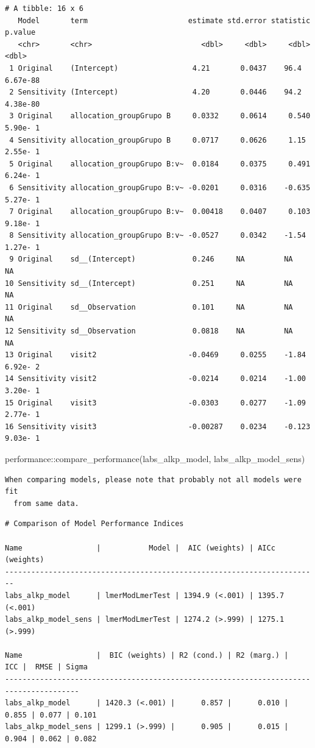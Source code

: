 \documentclass[
  letterpaper,
  DIV=11,
  numbers=noendperiod]{scrartcl}
\newenvironment{Shaded}{\begin{snugshade}}{\end{snugshade}}
\newcommand{\FunctionTok}[1]{\textcolor[rgb]{0.28,0.35,0.67}{#1}}
\newcommand{\NormalTok}[1]{\textcolor[rgb]{0.00,0.23,0.31}{#1}}
\newcommand{\SpecialCharTok}[1]{\textcolor[rgb]{0.37,0.37,0.37}{#1}}
\begin{document}
\begin{verbatim}
# A tibble: 16 x 6
   Model       term                       estimate std.error statistic   p.value
   <chr>       <chr>                         <dbl>     <dbl>     <dbl>     <dbl>
 1 Original    (Intercept)                 4.21       0.0437    96.4    6.67e-88
 2 Sensitivity (Intercept)                 4.20       0.0446    94.2    4.38e-80
 3 Original    allocation_groupGrupo B     0.0332     0.0614     0.540  5.90e- 1
 4 Sensitivity allocation_groupGrupo B     0.0717     0.0626     1.15   2.55e- 1
 5 Original    allocation_groupGrupo B:v~  0.0184     0.0375     0.491  6.24e- 1
 6 Sensitivity allocation_groupGrupo B:v~ -0.0201     0.0316    -0.635  5.27e- 1
 7 Original    allocation_groupGrupo B:v~  0.00418    0.0407     0.103  9.18e- 1
 8 Sensitivity allocation_groupGrupo B:v~ -0.0527     0.0342    -1.54   1.27e- 1
 9 Original    sd__(Intercept)             0.246     NA         NA     NA       
10 Sensitivity sd__(Intercept)             0.251     NA         NA     NA       
11 Original    sd__Observation             0.101     NA         NA     NA       
12 Sensitivity sd__Observation             0.0818    NA         NA     NA       
13 Original    visit2                     -0.0469     0.0255    -1.84   6.92e- 2
14 Sensitivity visit2                     -0.0214     0.0214    -1.00   3.20e- 1
15 Original    visit3                     -0.0303     0.0277    -1.09   2.77e- 1
16 Sensitivity visit3                     -0.00287    0.0234    -0.123  9.03e- 1
\end{verbatim}

\begin{Shaded}
\begin{Highlighting}[]
\NormalTok{performance}\SpecialCharTok{::}\FunctionTok{compare\_performance}\NormalTok{(labs\_alkp\_model, labs\_alkp\_model\_sens)}
\end{Highlighting}
\end{Shaded}

\begin{verbatim}
When comparing models, please note that probably not all models were fit
  from same data.
\end{verbatim}

\begin{verbatim}
# Comparison of Model Performance Indices

Name                 |           Model |  AIC (weights) | AICc (weights)
------------------------------------------------------------------------
labs_alkp_model      | lmerModLmerTest | 1394.9 (<.001) | 1395.7 (<.001)
labs_alkp_model_sens | lmerModLmerTest | 1274.2 (>.999) | 1275.1 (>.999)

Name                 |  BIC (weights) | R2 (cond.) | R2 (marg.) |   ICC |  RMSE | Sigma
---------------------------------------------------------------------------------------
labs_alkp_model      | 1420.3 (<.001) |      0.857 |      0.010 | 0.855 | 0.077 | 0.101
labs_alkp_model_sens | 1299.1 (>.999) |      0.905 |      0.015 | 0.904 | 0.062 | 0.082
\end{verbatim}
\end{document}
